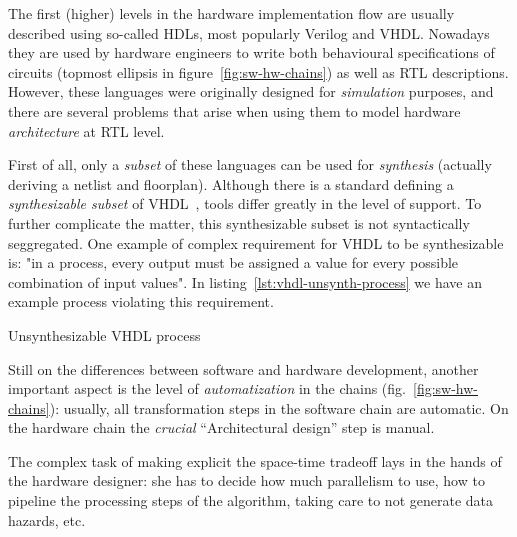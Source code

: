         The first (higher) levels in the hardware implementation flow are usually described using
        so-called \acp{HDL}, most popularly Verilog and \acs{VHDL}.
        Nowadays they are used by hardware engineers to write both behavioural specifications of circuits
        (topmost ellipsis in figure~\ref{fig:sw-hw-chains}) as well as \ac{RTL} descriptions.
        However, these languages were originally designed for \emph{simulation} purposes,
        and there are several problems that arise when using them to
        model hardware \emph{architecture} at \ac{RTL} level.

        First of all, only a \emph{subset} of these languages can be used for \emph{synthesis}
        (actually deriving a netlist and floorplan).
        Although there is a standard defining a \emph{synthesizable subset} of \acs{VHDL}~\cite{ieee1076-3-synth-vhdl},
        tools differ greatly in the level of support.
        To further complicate the matter, this synthesizable subset is not syntactically seggregated.
        One example of complex requirement for \acs{VHDL} to be synthesizable is:
        "in a process, every output must be assigned a value for every possible combination of input values".
        In listing~\ref{lst:vhdl-unsynth-process} we have an example process violating this requirement.

        \begin{listing}[h]
            \begin{center}
            \end{center}
            \caption{Unsynthesizable \acs{VHDL} process \label{lst:vhdl-unsynth-process}}
        \end{listing}

        Still on the differences between software and hardware development,
        another important aspect is the level of \emph{automatization} in the chains (fig.~\ref{fig:sw-hw-chains}):
        usually, all transformation steps in the software chain are automatic.
        On the hardware chain the \emph{crucial} ``Architectural design'' step is manual.

        The complex task of making explicit the space-time tradeoff lays in the hands of the hardware designer:
        she has to decide how much parallelism to use, how to pipeline the processing steps of the algorithm,
        taking care to not generate data hazards, etc.

